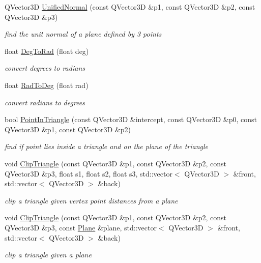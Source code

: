 \begin{DoxyCompactItemize}
Q\+Vector3D \hyperlink{namespaceShipCAD_a81e47e31f89000550b007c0f9a4d09aa}{Unified\+Normal} (const Q\+Vector3D \&p1, const Q\+Vector3D \&p2, const Q\+Vector3D \&p3)
\begin{DoxyCompactList}\small\item\em find the unit normal of a plane defined by 3 points \end{DoxyCompactList}\item 
float \hyperlink{namespaceShipCAD_ac344c080c66b4394cb988cf88c726029}{Deg\+To\+Rad} (float deg)
\begin{DoxyCompactList}\small\item\em convert degrees to radians \end{DoxyCompactList}\item 
float \hyperlink{namespaceShipCAD_a3ad1916db38fb61e8a053f944df49cee}{Rad\+To\+Deg} (float rad)
\begin{DoxyCompactList}\small\item\em convert radians to degrees \end{DoxyCompactList}\item 
bool \hyperlink{namespaceShipCAD_ae1773f0e415446342401a67430a8b643}{Point\+In\+Triangle} (const Q\+Vector3D \&intercept, const Q\+Vector3D \&p0, const Q\+Vector3D \&p1, const Q\+Vector3D \&p2)
\begin{DoxyCompactList}\small\item\em find if point lies inside a triangle and on the plane of the triangle \end{DoxyCompactList}\item 
void \hyperlink{namespaceShipCAD_a36b9b33181823761bc327d66c36c8d8f}{Clip\+Triangle} (const Q\+Vector3D \&p1, const Q\+Vector3D \&p2, const Q\+Vector3D \&p3, float s1, float s2, float s3, std\+::vector$<$ Q\+Vector3D $>$ \&front, std\+::vector$<$ Q\+Vector3D $>$ \&back)
\begin{DoxyCompactList}\small\item\em clip a triangle given vertex point distances from a plane \end{DoxyCompactList}\item 
void \hyperlink{namespaceShipCAD_a41e6294f71b66bca070c744accbb3ef2}{Clip\+Triangle} (const Q\+Vector3D \&p1, const Q\+Vector3D \&p2, const Q\+Vector3D \&p3, const \hyperlink{classShipCAD_1_1Plane}{Plane} \&plane, std\+::vector$<$ Q\+Vector3D $>$ \&front, std\+::vector$<$ Q\+Vector3D $>$ \&back)
\begin{DoxyCompactList}\small\item\em clip a triangle given a plane \end{DoxyCompactList}\item 

\end{DoxyCompactItemize}
